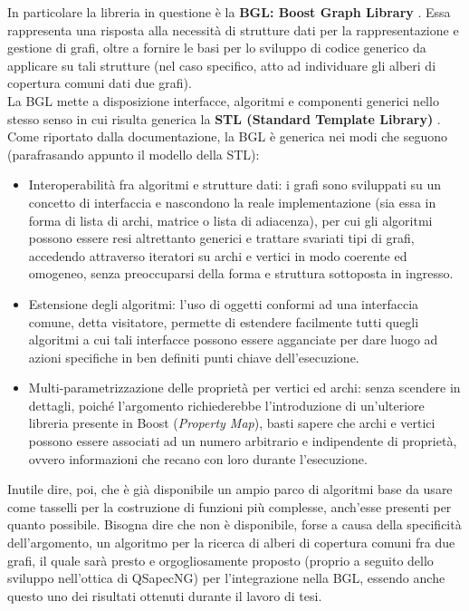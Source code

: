 In particolare la libreria in questione è la \textbf{BGL: Boost Graph Library} \cite{BGL}. Essa rappresenta una risposta alla necessità di strutture dati per la rappresentazione e gestione di grafi, oltre a fornire le basi per lo sviluppo di codice generico da applicare su tali strutture (nel caso specifico, atto ad individuare gli alberi di copertura comuni dati due grafi).\\
La BGL mette a disposizione interfacce, algoritmi e componenti generici nello stesso senso in cui risulta generica la \textbf{STL (Standard Template Library)} \cite{STL}. Come riportato dalla documentazione, la BGL è generica nei modi che seguono (parafrasando appunto il modello della STL):
\begin{itemize}
 \item Interoperabilità fra algoritmi e strutture dati: i grafi sono sviluppati su un concetto di interfaccia e nascondono la reale implementazione (sia essa in forma di lista di archi, matrice o lista di adiacenza), per cui gli algoritmi possono essere resi altrettanto generici e trattare svariati tipi di grafi, accedendo attraverso iteratori su archi e vertici in modo coerente ed omogeneo, senza preoccuparsi della forma e struttura sottoposta in ingresso.
 \item Estensione degli algoritmi: l'uso di oggetti conformi ad una interfaccia comune, detta visitatore, permette di estendere facilmente tutti quegli algoritmi a cui tali interfacce possono essere agganciate per dare luogo ad azioni specifiche in ben definiti punti chiave dell'esecuzione.
 \item Multi-parametrizzazione delle proprietà per vertici ed archi: senza scendere in dettagli, poiché l'argomento richiederebbe l'introduzione di un'ulteriore libreria presente in Boost (\textit{Property Map}), basti sapere che archi e vertici possono essere associati ad un numero arbitrario e indipendente di proprietà, ovvero informazioni che recano con loro durante l'esecuzione.
\end{itemize}

Inutile dire, poi, che è già disponibile un ampio parco di algoritmi base da usare come tasselli per la costruzione di funzioni più complesse, anch'esse presenti per quanto possibile. Bisogna dire che non è disponibile, forse a causa della specificità dell'argomento, un algoritmo per la ricerca di alberi di copertura comuni fra due grafi, il quale sarà presto e orgogliosamente proposto (proprio a seguito dello sviluppo nell'ottica di QSapecNG) per l'integrazione nella BGL, essendo anche questo uno dei risultati ottenuti durante il lavoro di tesi.


